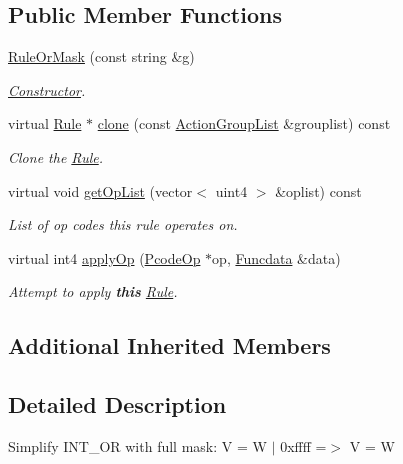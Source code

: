 \subsection*{Public Member Functions}
\begin{DoxyCompactItemize}
\item 
\mbox{\hyperlink{class_rule_or_mask_ad53b25abac7c7e847417fb431e9f374c}{Rule\+Or\+Mask}} (const string \&g)
\begin{DoxyCompactList}\small\item\em \mbox{\hyperlink{class_constructor}{Constructor}}. \end{DoxyCompactList}\item 
virtual \mbox{\hyperlink{class_rule}{Rule}} $\ast$ \mbox{\hyperlink{class_rule_or_mask_a3e58258633ca9f6a88262b88b95672a1}{clone}} (const \mbox{\hyperlink{class_action_group_list}{Action\+Group\+List}} \&grouplist) const
\begin{DoxyCompactList}\small\item\em Clone the \mbox{\hyperlink{class_rule}{Rule}}. \end{DoxyCompactList}\item 
virtual void \mbox{\hyperlink{class_rule_or_mask_a6261fe302ae9f251cfe27056e702fe49}{get\+Op\+List}} (vector$<$ uint4 $>$ \&oplist) const
\begin{DoxyCompactList}\small\item\em List of op codes this rule operates on. \end{DoxyCompactList}\item 
virtual int4 \mbox{\hyperlink{class_rule_or_mask_ab0e9a7d945a09be5c298cd08937ab6a7}{apply\+Op}} (\mbox{\hyperlink{class_pcode_op}{Pcode\+Op}} $\ast$op, \mbox{\hyperlink{class_funcdata}{Funcdata}} \&data)
\begin{DoxyCompactList}\small\item\em Attempt to apply {\bfseries{this}} \mbox{\hyperlink{class_rule}{Rule}}. \end{DoxyCompactList}\end{DoxyCompactItemize}
\subsection*{Additional Inherited Members}


\subsection{Detailed Description}
Simplify I\+N\+T\+\_\+\+OR with full mask\+: {\ttfamily V = W $\vert$ 0xffff =$>$ V = W} 

